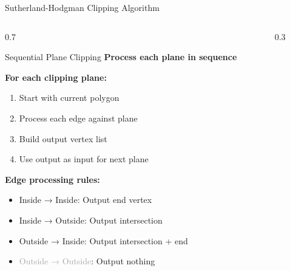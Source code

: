 \begin{frame}{Sutherland-Hodgman Clipping Algorithm}
  \footnotesize
  \begin{columns}
    \begin{column}{0.7\textwidth}
      \begin{raybox}{Sequential Plane Clipping}
        \textbf{Process each plane in sequence}

        \vspace{0.2cm}
        \textbf{For each clipping plane:}
        \begin{enumerate}
          \item Start with current polygon
          \item Process each edge against plane
          \item Build output vertex list
          \item Use output as input for next plane
        \end{enumerate}

        \vspace{0.2cm}
        \textbf{Edge processing rules:}
        \begin{itemize}
          \item \textcolor{SecondaryColor}{Inside → Inside}: Output end vertex
          \item \textcolor{AccentColor}{Inside → Outside}: Output intersection
          \item \textcolor{ObjectColor}{Outside → Inside}: Output intersection + end
          \item \textcolor{DarkGray}{Outside → Outside}: Output nothing
        \end{itemize}
      \end{raybox}
    \end{column}
    \begin{column}{0.3\textwidth}
\end{column}
\end{columns}
\end{frame}
